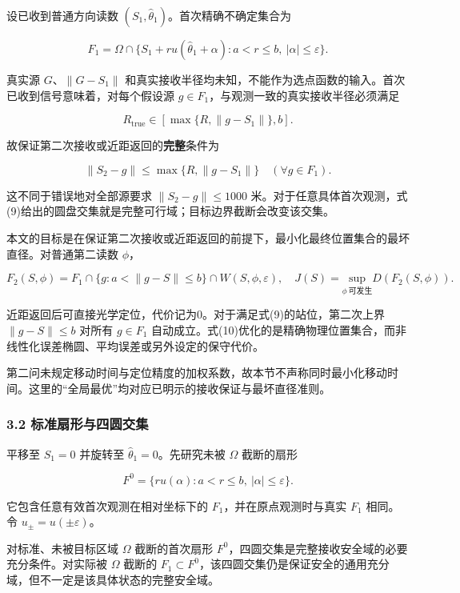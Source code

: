 \documentclass[
  11pt,
  fontset=none]{ctexart}
\begin{document}
设已收到普通方向读数 \((S_1,\widehat\theta_1)\)。首次精确不确定集合为

\[
F_1=\Omega\cap\{S_1+r u(\widehat\theta_1+\alpha):a<r\le b,\ |\alpha|\le\varepsilon\}. \tag{7}
\]

真实源 \(G\)、\(\|G-S_1\|\)
和真实接收半径均未知，不能作为选点函数的输入。首次已收到信号意味着，对每个假设源
\(g\in F_1\)，与观测一致的真实接收半径必须满足

\[
R_{\mathrm{true}}\in[\max\{R,\|g-S_1\|\},b]. \tag{8}
\]

故保证第二次接收或近距返回的\textbf{完整}条件为

\[
\|S_2-g\|\le\max\{R,\|g-S_1\|\}\quad(\forall g\in F_1). \tag{9}
\]

这不同于错误地对全部源要求 \(\|S_2-g\|\le1000\)
米。对于任意具体首次观测，式(9)给出的圆盘交集就是完整可行域；目标边界截断会改变该交集。

本文的目标是在保证第二次接收或近距返回的前提下，最小化最终位置集合的最坏直径。对普通第二读数
\(\phi\)，

\[
F_2(S,\phi)=F_1\cap\{g:a<\|g-S\|\le b\}\cap W(S,\phi,\varepsilon),
\quad J(S)=\underset{\phi\ \text{可发生}}{\text{sup}}D(F_2(S,\phi)). \tag{10}
\]

近距返回后可直接光学定位，代价记为0。对于满足式(9)的站位，第二次上界
\(\|g-S\|\le b\) 对所有 \(g\in F_1\)
自动成立。式(10)优化的是精确物理位置集合，而非线性化误差椭圆、平均误差或另外设定的保守代价。

第二问未规定移动时间与定位精度的加权系数，故本节不声称同时最小化移动时间。这里的``全局最优''均对应已明示的接收保证与最坏直径准则。

\subsubsection{3.2
标准扇形与四圆交集}\label{ux6807ux51c6ux6247ux5f62ux4e0eux56dbux5706ux4ea4ux96c6}

平移至 \(S_1=0\) 并旋转至 \(\widehat\theta_1=0\)。先研究未被 \(\Omega\)
截断的扇形

\[
F^0=\{r u(\alpha):a<r\le b,\ |\alpha|\le\varepsilon\}.
\]

它包含任意有效首次观测在相对坐标下的 \(F_1\)，并在原点观测时与真实
\(F_1\) 相同。令 \(u_{\text{±}}=u(\pm\varepsilon)\)。

对标准、未被目标区域 \(\Omega\) 截断的首次扇形
\(F^0\)，四圆交集是完整接收安全域的必要充分条件。对实际被 \(\Omega\)
截断的
\(F_1\subset F^0\)，该四圆交集仍是保证安全的通用充分域，但不一定是该具体状态的完整安全域。
\end{document}
